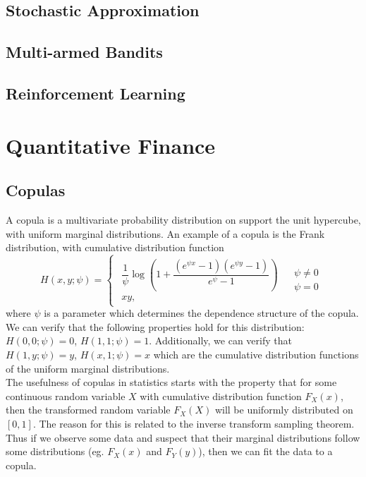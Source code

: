 \documentclass[11pt]{report} %
\begin{document}
\section{Stochastic Approximation}

\section{Multi-armed Bandits}

\section{Reinforcement Learning}

\chapter{Quantitative Finance}

\section{Copulas}

A copula is a multivariate probability distribution on support the unit hypercube, with uniform marginal distributions. An example of a copula is the Frank distribution, with cumulative distribution function
\begin{equation}
H\left(x, y; \psi\right) = \begin{cases}
\begin{array}{c}
\dfrac{1}{\psi}\log\left(1+\dfrac{\left(e^{\psi x}-1\right)\left(e^{\psi y}-1\right)}{e^{\psi}-1}\right)\\
xy,
\end{array} & \begin{array}{c}
\psi\neq0\\
\psi=0
\end{array}\end{cases}
\end{equation}
where $\psi$ is a parameter which determines the dependence structure of the copula. We can verify that the following properties hold for this distribution: $H\left(0, 0; \psi\right) = 0$, $H\left(1, 1; \psi\right) = 1$. Additionally, we can verify that $H\left(1, y; \psi\right) = y$, $H\left(x, 1; \psi\right) = x$ which are the cumulative distribution functions of the uniform marginal distributions. \\

The usefulness of copulas in statistics starts with the property that for some continuous random variable $X$ with cumulative distribution function $F_{X}\left(x\right)$, then the transformed random variable $F_{X}\left(X\right)$ will be uniformly distributed on $\left[0, 1\right]$. The reason for this is related to the inverse transform sampling theorem. Thus if we observe some data and suspect that their marginal distributions follow some distributions (eg. $F_{X}\left(x\right)$ and $F_{Y}\left(y\right)$), then we can fit the data to a copula. \\
\end{document}
